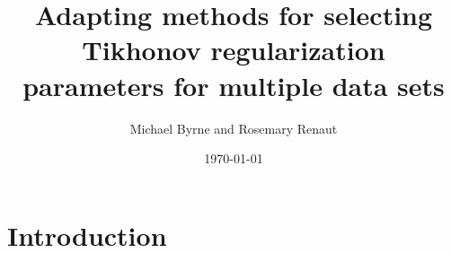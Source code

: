 \documentclass[12pt]{article}
\title{Adapting methods for selecting Tikhonov regularization parameters for multiple data sets}
\author{Michael Byrne and Rosemary Renaut}
\date{\today}
\begin{document}
\maketitle


\tableofcontents
\newpage

\section{Introduction} \label{sec:Introduction}
\end{document}
